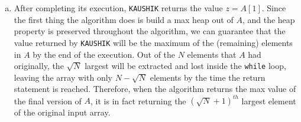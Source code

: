 \documentclass{article}
\begin{document}
\begin{enumerate}[1.]
\begin{enumerate}[(a)]
        \item After completing its execution, \texttt{KAUSHIK} returns the value $z = A[1]$. Since the first thing the algorithm does is build a max heap out of $A$, and the heap property is preserved throughout the algorithm, we can guarantee that the value returned by \texttt{KAUSHIK} will be the maximum of the (remaining) elements in $A$ by the end of the execution. Out of the $N$ elements that $A$ had originally, the $\sqrt{N}$ largest will be extracted and lost inside the \texttt{while} loop, leaving the array with only $N - \sqrt{N}$ elements by the time the return statement is reached. Therefore, when the algorithm returns the max value of the final version of $A$, it is in fact returning the $(\sqrt{N} + 1)^{th}$ largest element of the original input array.
    \end{enumerate}

\end{enumerate}
\end{document}
